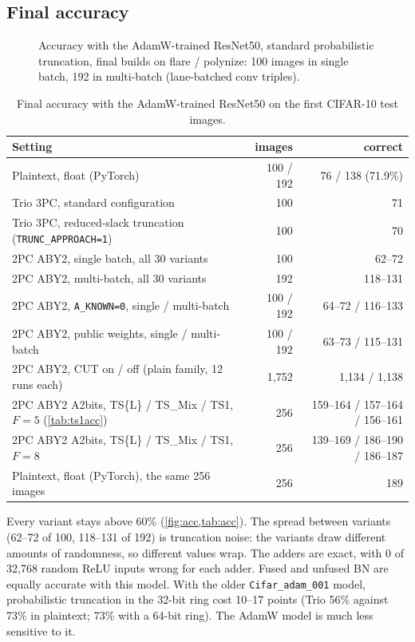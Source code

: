 \documentclass[10pt,a4paper]{article}
\newcommand{\flag}[1]{\nolinkurl{#1}}
\begin{document}


\subsection{Final accuracy}

\begin{figure}[t]
  \centering
  \caption{Accuracy with the AdamW-trained ResNet50, standard probabilistic truncation, final builds on
  flare / polynize: 100 images in single batch, 192 in multi-batch (lane-batched conv triples).}
  \label{fig:acc}
\end{figure}

\begin{table}[t]
\centering\small
\begin{tabular}{@{}lrr@{}}
\toprule
Setting & images & correct\\
\midrule
Plaintext, float (PyTorch) & 100 / 192 & 76 / 138 (71.9\%)\\
Trio 3PC, standard configuration & 100 & 71\\
Trio 3PC, reduced-slack truncation (\flag{TRUNC_APPROACH=1}) & 100 & 70\\
2PC ABY2, single batch, all 30 variants & 100 & 62--72\\
2PC ABY2, multi-batch, all 30 variants & 192 & 118--131\\
2PC ABY2, \flag{A_KNOWN=0}, single / multi-batch & 100 / 192 & 64--72 / 116--133\\
2PC ABY2, public weights, single / multi-batch & 100 / 192 & 63--73 / 115--131\\
2PC ABY2, CUT on / off (plain family, 12 runs each) & 1,752 & 1,134 / 1,138\\
2PC ABY2 A2bits, TS\{L\} / TS\_Mix / TS1, $F = 5$ (\cref{tab:ts1acc}) & 256 & 159--164 / 157--164 / 156--161\\
2PC ABY2 A2bits, TS\{L\} / TS\_Mix / TS1, $F = 8$ & 256 & 139--169 / 186--190 / 186--187\\
Plaintext, float (PyTorch), the same 256 images & 256 & 189\\
\bottomrule
\end{tabular}
\caption{Final accuracy with the AdamW-trained ResNet50 on the first CIFAR-10 test images.}
\label{tab:acc}
\end{table}

Every variant stays above 60\% (\cref{fig:acc,tab:acc}). The spread between variants
(62--72 of 100, 118--131 of 192) is truncation noise: the variants draw different amounts of randomness, so different
values wrap. The adders are exact, with 0 of 32,768 random ReLU inputs wrong for each adder. Fused and unfused BN are equally accurate with this model.
With the older \texttt{Cifar\_adam\_001} model, probabilistic truncation in the 32-bit ring cost 10--17
points (Trio 56\% against 73\% in plaintext; 73\% with a 64-bit ring). The AdamW model is much less sensitive to it.
\end{document}
